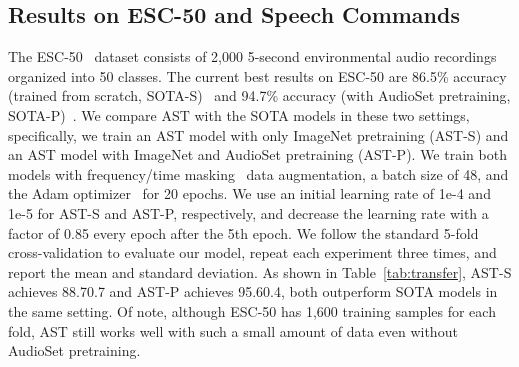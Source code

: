 \documentclass[a4paper]{article}
\begin{document}
\subsection{Results on ESC-50 and Speech Commands}
\label{sec:transfer}
The ESC-50~\cite{piczak2015esc} dataset consists of 2,000 5-second environmental audio recordings organized into 50 classes. The current best results on ESC-50 are 86.5\% accuracy (trained from scratch, SOTA-S)~\cite{sailor2017unsupervised} and 94.7\% accuracy (with AudioSet pretraining, SOTA-P)~\cite{kong2020panns}. We compare AST with the SOTA models in these two settings, specifically, we train an AST model with only ImageNet pretraining (AST-S) and an AST model with ImageNet and AudioSet pretraining (AST-P). We train both models with frequency/time masking~\cite{park2019specaugment} data augmentation, a batch size of 48, and the Adam optimizer~\cite{kingma2015adam} for 20 epochs. We use an initial learning rate of 1e-4 and 1e-5 for AST-S and AST-P, respectively, and decrease the learning rate with a factor of 0.85 every epoch after the 5th epoch. We follow the standard 5-fold cross-validation to evaluate our model, repeat each experiment three times, and report the mean and standard deviation. As shown in Table~\ref{tab:transfer}, AST-S achieves 88.70.7 and AST-P achieves 95.60.4, both outperform SOTA models in the same setting. Of note, although ESC-50 has 1,600 training samples for each fold, AST still works well with such a small amount of data even without AudioSet pretraining.
\end{document}
